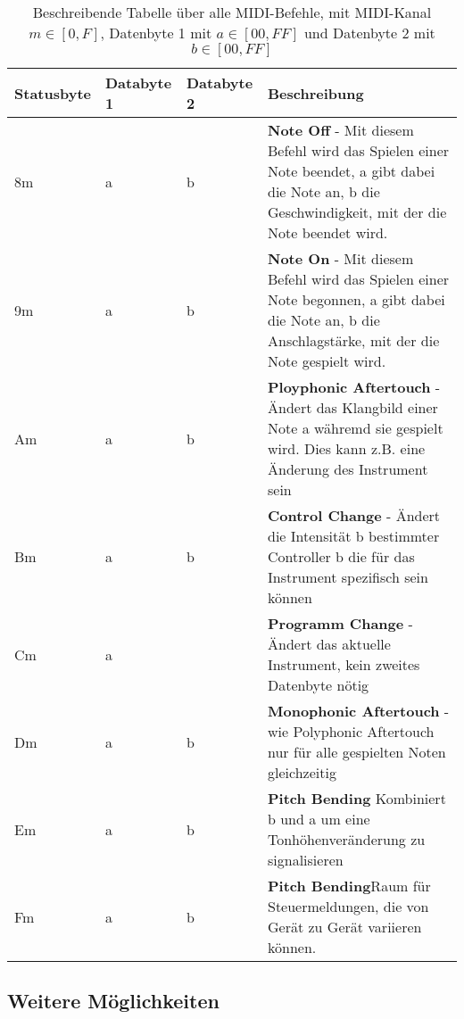 \begin{table} %
	
	\begin{tabular}{C{0.15\textwidth}|C{0.15\textwidth}|C{0.15\textwidth}|L{0.45\textwidth}}
		\textbf{ Statusbyte}  & \textbf{Databyte} 1 & \textbf{Databyte 2} & \textbf{Beschreibung}\\ 
		\hline 
		8m & a  &  b & \textbf{Note Off} - Mit diesem Befehl wird das Spielen einer Note beendet, a gibt dabei die Note an, b die Geschwindigkeit, mit der die Note beendet wird.\\
		\hline 
		9m & a  &  b & \textbf{Note On} - Mit diesem Befehl wird das Spielen einer Note begonnen, a gibt dabei die Note an, b die Anschlagstärke, mit der die Note gespielt wird.\\
		\hline 
		Am & a  &  b & \textbf{Ployphonic Aftertouch} - Ändert das Klangbild einer Note a währemd sie gespielt wird. Dies kann z.B. eine Änderung des Instrument sein\\
		\hline 
		Bm & a  &  b & \textbf{Control Change} - Ändert die Intensität b bestimmter Controller b die für das Instrument spezifisch sein können\\
		\hline 
		Cm & a  &   & \textbf{Programm Change} - Ändert das aktuelle Instrument, kein zweites Datenbyte nötig\\
		\hline 
		Dm & a  & b  & \textbf{Monophonic Aftertouch} - wie Polyphonic Aftertouch nur für alle gespielten Noten gleichzeitig\\
		\hline 
		Em & a  & b  & \textbf{Pitch Bending} Kombiniert b und a um eine Tonhöhenveränderung zu signalisieren\\
		\hline 
		Fm & a  & b  & \textbf{Pitch Bending}Raum für Steuermeldungen, die von Gerät zu Gerät variieren können.\\
	\end{tabular}
	\caption[Tabelle über MIDI-Befehle]{Beschreibende Tabelle über alle MIDI-Befehle, mit MIDI-Kanal $m\in\left[ 0,F \right]$, Datenbyte 1 mit $a\in\left[ 00,FF \right]$ und Datenbyte 2 mit $b\in\left[ 00,FF \right]$}
	\label{theorie:befehle}

\end{table}


\subsection{Weitere Möglichkeiten}

